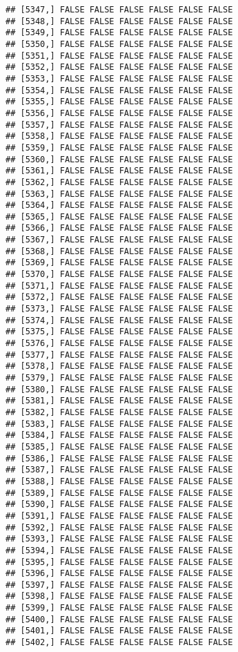 \documentclass[
]{article}
\begin{document}
\begin{verbatim}
## [5347,] FALSE FALSE FALSE FALSE FALSE FALSE
## [5348,] FALSE FALSE FALSE FALSE FALSE FALSE
## [5349,] FALSE FALSE FALSE FALSE FALSE FALSE
## [5350,] FALSE FALSE FALSE FALSE FALSE FALSE
## [5351,] FALSE FALSE FALSE FALSE FALSE FALSE
## [5352,] FALSE FALSE FALSE FALSE FALSE FALSE
## [5353,] FALSE FALSE FALSE FALSE FALSE FALSE
## [5354,] FALSE FALSE FALSE FALSE FALSE FALSE
## [5355,] FALSE FALSE FALSE FALSE FALSE FALSE
## [5356,] FALSE FALSE FALSE FALSE FALSE FALSE
## [5357,] FALSE FALSE FALSE FALSE FALSE FALSE
## [5358,] FALSE FALSE FALSE FALSE FALSE FALSE
## [5359,] FALSE FALSE FALSE FALSE FALSE FALSE
## [5360,] FALSE FALSE FALSE FALSE FALSE FALSE
## [5361,] FALSE FALSE FALSE FALSE FALSE FALSE
## [5362,] FALSE FALSE FALSE FALSE FALSE FALSE
## [5363,] FALSE FALSE FALSE FALSE FALSE FALSE
## [5364,] FALSE FALSE FALSE FALSE FALSE FALSE
## [5365,] FALSE FALSE FALSE FALSE FALSE FALSE
## [5366,] FALSE FALSE FALSE FALSE FALSE FALSE
## [5367,] FALSE FALSE FALSE FALSE FALSE FALSE
## [5368,] FALSE FALSE FALSE FALSE FALSE FALSE
## [5369,] FALSE FALSE FALSE FALSE FALSE FALSE
## [5370,] FALSE FALSE FALSE FALSE FALSE FALSE
## [5371,] FALSE FALSE FALSE FALSE FALSE FALSE
## [5372,] FALSE FALSE FALSE FALSE FALSE FALSE
## [5373,] FALSE FALSE FALSE FALSE FALSE FALSE
## [5374,] FALSE FALSE FALSE FALSE FALSE FALSE
## [5375,] FALSE FALSE FALSE FALSE FALSE FALSE
## [5376,] FALSE FALSE FALSE FALSE FALSE FALSE
## [5377,] FALSE FALSE FALSE FALSE FALSE FALSE
## [5378,] FALSE FALSE FALSE FALSE FALSE FALSE
## [5379,] FALSE FALSE FALSE FALSE FALSE FALSE
## [5380,] FALSE FALSE FALSE FALSE FALSE FALSE
## [5381,] FALSE FALSE FALSE FALSE FALSE FALSE
## [5382,] FALSE FALSE FALSE FALSE FALSE FALSE
## [5383,] FALSE FALSE FALSE FALSE FALSE FALSE
## [5384,] FALSE FALSE FALSE FALSE FALSE FALSE
## [5385,] FALSE FALSE FALSE FALSE FALSE FALSE
## [5386,] FALSE FALSE FALSE FALSE FALSE FALSE
## [5387,] FALSE FALSE FALSE FALSE FALSE FALSE
## [5388,] FALSE FALSE FALSE FALSE FALSE FALSE
## [5389,] FALSE FALSE FALSE FALSE FALSE FALSE
## [5390,] FALSE FALSE FALSE FALSE FALSE FALSE
## [5391,] FALSE FALSE FALSE FALSE FALSE FALSE
## [5392,] FALSE FALSE FALSE FALSE FALSE FALSE
## [5393,] FALSE FALSE FALSE FALSE FALSE FALSE
## [5394,] FALSE FALSE FALSE FALSE FALSE FALSE
## [5395,] FALSE FALSE FALSE FALSE FALSE FALSE
## [5396,] FALSE FALSE FALSE FALSE FALSE FALSE
## [5397,] FALSE FALSE FALSE FALSE FALSE FALSE
## [5398,] FALSE FALSE FALSE FALSE FALSE FALSE
## [5399,] FALSE FALSE FALSE FALSE FALSE FALSE
## [5400,] FALSE FALSE FALSE FALSE FALSE FALSE
## [5401,] FALSE FALSE FALSE FALSE FALSE FALSE
## [5402,] FALSE FALSE FALSE FALSE FALSE FALSE

\end{verbatim}
\end{document}
